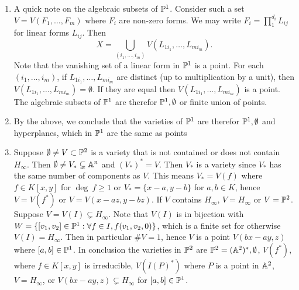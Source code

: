     \begin{example}
        \begin{enumerate}
            \item A quick note on the algebraic subsets of $\mathbb{P}^1$. Consider such a set $V=V(F_1,\dots,F_m)$ where $F_i$ are non-zero forms. We may write $F_i = \prod_1^{d_i} L_{ij}$  for linear forms $L_{ij}$. Then 
            $$X= \bigcup_{(i_1,\dots,i_m)} V(L_{1i_1},\dots,L_{mi_m}).$$
            Note that the vanishing set of a linear form in $\mathbb{P}^1$ is a point. For each $(i_1,\dots,i_m)$, if $L_{1i_1},\dots,L_{mi_m}$ are distinct (up to multiplication by a unit), then $V(L_{1i_1},\dots,L_{mi_m}) =\emptyset$. If they are equal then $V(L_{1i_1},\dots,L_{mi_m})$ is a point. The algebraic subsets of $\mathbb{P}^1$ are therefor $\mathbb{P}^1,\emptyset$ or finite union of points. 
            \item By the above, we conclude that the varieties of $\mathbb{P}^1$ are therefor $\mathbb{P}^1,\emptyset$ and hyperplanes, which in $\mathbb{P}^1$ are the same as points
            \item Suppose $\emptyset \neq V\subset \mathbb{P}^2$ is a variety that is not contained or does not contain $H_\infty$. Then $\emptyset \neq V_\ast\subsetneq \mathbb{A}^n$ and $(V_\ast)^\ast=V$. Then $V_\ast$ is a variety since $V_\ast$ has the same number of components as $V$. This means $V_\ast = V(f)$ where $f\in K[x,y]$ for $\deg \ f \geq 1$ or $V_\ast =\{x-a,y-b\}$ for $a,b\in K$, hence $V=V(f^\ast)$ or $V=V(x-az,y-bz)$. If $V$ contains $H_\infty$, $V=H_\infty$ or $V=\mathbb{P}^2$. Suppose $V=V(I)\subsetneq  H_\infty$. Note that $V(I)$ is in bijection with $W=\{[v_1,v_2]\in\mathbb{P}^1 :\forall f\in I, f(v_1,v_2,0)\}$, which is a finite set for otherwise $V(I)= H_\infty$. Then in particular $\#V = 1$, hence $V$ is a point $V(bx-ay,z)$ where $[a,b]\in \mathbb{P}^1$. In conclusion the varieties in $\mathbb{P}^2$ are $\mathbb{P}^2 = (\mathbb{A}^2)^\ast, \emptyset$, $V(f^\ast)$, where $f\in K[x,y]$ is irreducible, $V(I(P)^\ast)$ where $P$ is a point in $\mathbb{A}^2$, $V=H_\infty$, or $V(bx-ay,z)\subsetneq H_\infty$ for $[a,b]\in \mathbb{P}^1$.
        \end{enumerate}
    \end{example}
